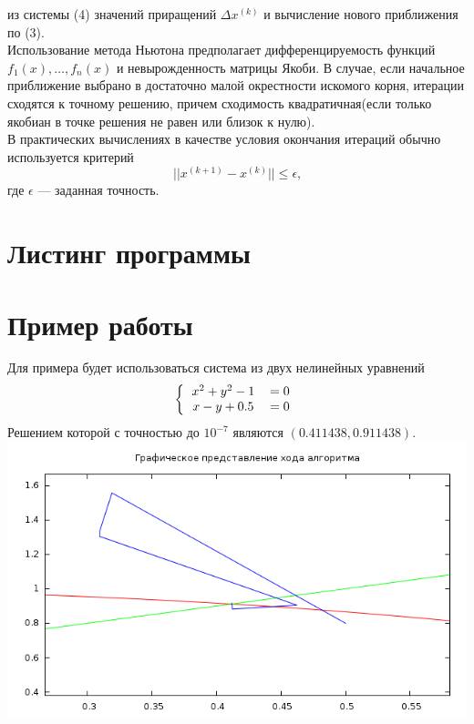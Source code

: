 \documentclass[a4paper, 12pt]{article}
\begin{document}
из системы (4) значений приращений $\Delta x^{(k)}$ и вычисление нового приближения по (3).\\
Использование метода Ньютона предполагает дифференцируемость функций $f_1(x),\ldots ,f_n(x)$ и невырожденность матрицы Якоби. В случае, если 
начальное приближение выбрано в достаточно малой окрестности искомого корня, итерации сходятся к точному решению, причем сходимость квадратичная(если только якобиан в точке решения не равен или близок к нулю).\\
В практических вычислениях в качестве условия окончания итераций обычно используется критерий 
\begin{equation}
	|| x^{(k+1)} - x^{(k)} || \leq \epsilon \text{,}
\end{equation}
где $\epsilon$ --- заданная точность.
\newpage
\section*{Листинг программы}


\newpage
\section*{Пример работы}
Для примера будет использоваться система из двух нелинейных уравнений 
\begin{equation}
	\left\{
		\begin{tabular}{cc}
			$x^2 + y^2 - 1 $&$ = 0$\\
			$x-y+0.5$&$ = 0$
		\end{tabular}
		\right.
\end{equation}
Решением которой с точностью до $10^{-7}$ являются $(0.411438, 0.911438)$.
\includegraphics[width=\linewidth]{xs.png}
\end{document}
